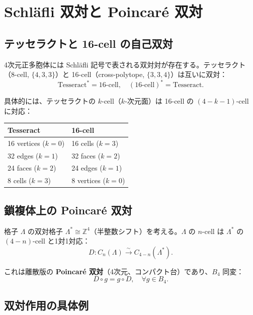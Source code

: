 \documentclass[a4paper,11pt]{ltjsarticle}
\begin{document}
\section{Schläfli 双対と Poincaré 双対}

\subsection{テッセラクトと 16-cell の自己双対}

4次元正多胞体には Schläfli 記号で表される双対対が存在する。テッセラクト（8-cell, $\{4,3,3\}$）と 16-cell（cross-polytope, $\{3,3,4\}$）は互いに双対：
\[ \text{Tesseract}^* = \text{16-cell}, \quad (\text{16-cell})^* = \text{Tesseract}. \]

具体的には、テッセラクトの $k$-cell（$k$-次元面）は 16-cell の $(4-k-1)$-cell に対応：

\begin{center}
\begin{tabular}{ll}
\toprule
Tesseract & 16-cell \\
\midrule
16 vertices ($k=0$) & 16 cells ($k=3$) \\
32 edges ($k=1$) & 32 faces ($k=2$) \\
24 faces ($k=2$) & 24 edges ($k=1$) \\
8 cells ($k=3$) & 8 vertices ($k=0$) \\
\bottomrule
\end{tabular}
\end{center}

\subsection{鎖複体上の Poincaré 双対}

格子 $\Lambda$ の双対格子 $\Lambda^* \cong \mathbb{Z}^4$（半整数シフト）を考える。$\Lambda$ の $n$-cell は $\Lambda^*$ の $(4-n)$-cell と1対1対応：
\begin{equation}
D : C_n(\Lambda) \xrightarrow{\sim} C_{4-n}(\Lambda^*). \tag{3.1}
\end{equation}

これは離散版の \textbf{Poincaré 双対}（4次元、コンパクト台）であり、$B_4$ 同変：
\begin{equation}
D \circ g = g \circ D, \quad \forall g \in B_4. \tag{3.2}
\end{equation}

\subsection{双対作用の具体例}
\end{document}
